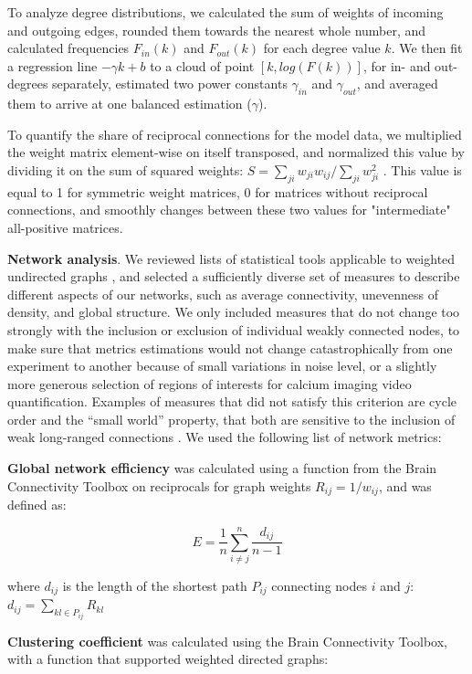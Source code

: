\documentclass{article}
\begin{document}
To analyze degree distributions, we calculated the sum of weights of incoming and outgoing edges, rounded them towards the nearest whole number, and calculated frequencies $F_{in}(k)$ and $F_{out}(k)$ for each degree value $k$. We then fit a regression line $-\gamma k + b$ to a cloud of point $[k , log(F(k)) ]$, for in- and out-degrees separately, estimated two power constants $\gamma_{in}$ and $\gamma_{out}$, and averaged them to arrive at one balanced estimation ($\gamma$).

To quantify the share of reciprocal connections for the model data, we multiplied the weight matrix element-wise on itself transposed, and normalized this value by dividing it on the sum of squared weights: $S=\sum_{ji}{w_{ji} w_{ij}} / \sum_{ji}{w_{ji}^2}$ . This value is equal to 1 for symmetric weight matrices, 0 for matrices without reciprocal connections, and smoothly changes between these two values for "intermediate" all-positive matrices.

\textbf{Network analysis}. We reviewed lists of statistical tools applicable to weighted undirected graphs \citep{rubinov2010toolbox}, and selected a sufficiently diverse set of measures to describe  different aspects of our networks, such as average connectivity, unevenness of density, and global structure. We only included measures that do not change too strongly with the inclusion or exclusion of individual weakly connected nodes, to make sure that metrics estimations would not change catastrophically from one experiment to another because of small variations in noise level, or a slightly more generous selection of regions of interests for calcium imaging video quantification. Examples of measures that did not satisfy this criterion are cycle order and the “small world” property, that both are sensitive to the inclusion of weak long-ranged connections \citep{papo2016beware}. We used the following list of network metrics:

\textbf{Global network efficiency} was calculated using a function from the Brain Connectivity Toolbox \citep{rubinov2010toolbox} on reciprocals for graph weights $R_{ij} = 1/w_{ij}$, and was defined as:

\[ E = \frac{1}{n} \sum_{i \neq j}^n{\frac{d_{ij}}{n-1}} \]

where $d_{ij}$ is the length of the shortest path $P_{ij}$ connecting nodes $i$ and $j$: $d_{ij} = \sum_{kl \in P_{ij}}{R_{kl}}$

\textbf{Clustering coefficient} \citep{fagiolo2007} was calculated using the Brain Connectivity Toolbox, with a function that supported weighted directed graphs:
\end{document}
